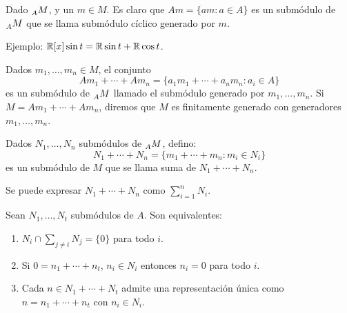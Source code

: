 \begin{df}
  Dado \(\prescript{}{A}{M}\), y un \(m\in M\). Es claro que
  \(Am=\{am:a\in A\}\) es un submódulo de \(\prescript{}{A}{M}\) que se llama submódulo
  cíclico generado por \(m\).
\end{df}

Ejemplo: \(\mathbb{R}[x]\sin t=\mathbb{R}\sin t+\mathbb{R}\cos t\).

\begin{df}
  Dados \(m_1,\ldots, m_n\in M\), el conjunto
  \[
    Am_1+\cdots+Am_n=\{a_1 m_1+\cdots+a_n m_n: a_i\in A\}
  \]
  es un submódulo de \(\prescript{}{A}{M}\) llamado el submódulo generado por
  \(m_1,\ldots, m_n\).
  Si \(M=Am_1+\cdots+Am_n\), diremos que \(M\) es finitamente generado
  con generadores
  \(m_1,\ldots, m_n\).
\end{df}

\begin{df}
  Dados \(N_1,\ldots, N_n\) submódulos de \(\prescript{}{A}{M}\), defino:
  \[
    N_1+\cdots+ N_n=\{m_1+\cdots+m_n: m_i\in N_i\}
  \]
  es un submódulo de \(M\) que se llama suma de \(N_1+\cdots+N_n\).
\end{df}

\begin{nt}
  Se puede expresar \(N_1+\cdots+ N_n\) como \(\sum_{i=1}^n N_i\).
\end{nt}

\begin{prop}
  Sean \(N_1,\ldots, N_t\) submódulos de \(A\). Son equivalentes:
  \begin{enumerate}
    \item \(N_i\cap\sum_{j\neq i}N_j =\{0\}\) para todo \(i\).
    \item Si \(0=n_1+\cdots+n_t\), \(n_i\in N_i\) entonces \(n_i=0\)
      para todo \(i\).
    \item Cada \(n\in N_1+\cdots+N_t\) admite una representación
      única como \(n=n_1+\cdots+n_t\) con \(n_i\in N_i\).
  \end{enumerate}
\end{prop}
